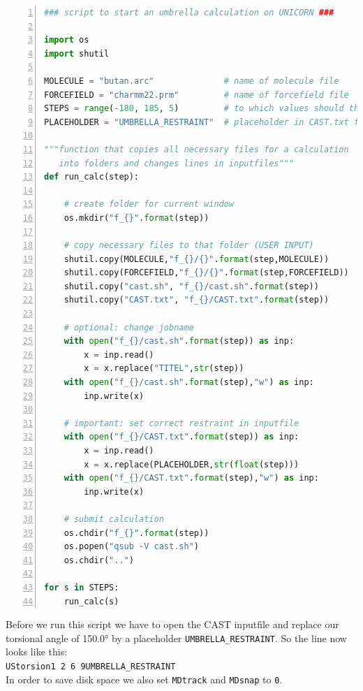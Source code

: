 \documentclass[a4paper,11pt]{scrartcl}
\begin{document}
\begin{lstlisting}[frame=single,language=python,basicstyle=\footnotesize,commentstyle=\color{red},keywordstyle=\color{blue},stringstyle=\color{mygreen},numbers=left,escapechar=|]
### script to start an umbrella calculation on UNICORN ###

import os
import shutil

MOLECULE = "butan.arc"              # name of molecule file
FORCEFIELD = "charmm22.prm"         # name of forcefield file
STEPS = range(-180, 185, 5)         # to which values should the restraint be set?
PLACEHOLDER = "UMBRELLA_RESTRAINT"  # placeholder in CAST.txt file 

"""function that copies all necessary files for a calculation 
   into folders and changes lines in inputfiles"""
def run_calc(step):

    # create folder for current window
    os.mkdir("f_{}".format(step))  

    # copy necessary files to that folder (USER INPUT)
    shutil.copy(MOLECULE,"f_{}/{}".format(step,MOLECULE))
    shutil.copy(FORCEFIELD,"f_{}/{}".format(step,FORCEFIELD))
    shutil.copy("cast.sh", "f_{}/cast.sh".format(step))
    shutil.copy("CAST.txt", "f_{}/CAST.txt".format(step))

    # optional: change jobname
    with open("f_{}/cast.sh".format(step)) as inp:
        x = inp.read()
        x = x.replace("TITEL",str(step))
    with open("f_{}/cast.sh".format(step),"w") as inp:
        inp.write(x)

    # important: set correct restraint in inputfile
    with open("f_{}/CAST.txt".format(step)) as inp:
        x = inp.read()
        x = x.replace(PLACEHOLDER,str(float(step)))
    with open("f_{}/CAST.txt".format(step),"w") as inp:
        inp.write(x)

    # submit calculation
    os.chdir("f_{}".format(step))
    os.popen("qsub -V cast.sh")
    os.chdir("..")

for s in STEPS:
    run_calc(s)

\end{lstlisting}

Before we run this script we have to open the CAST inputfile and replace our torsional angle of 150.0° by a placeholder \texttt{UMBRELLA\_RESTRAINT}. So the line now looks like this:\\
\texttt{UStorsion\hspace{2cm}1 2 6 9\quad UMBRELLA\_RESTRAINT}\\
In order to save disk space we also set \texttt{MDtrack} and \texttt{MDsnap} to \texttt{0}.\\
\end{document}
